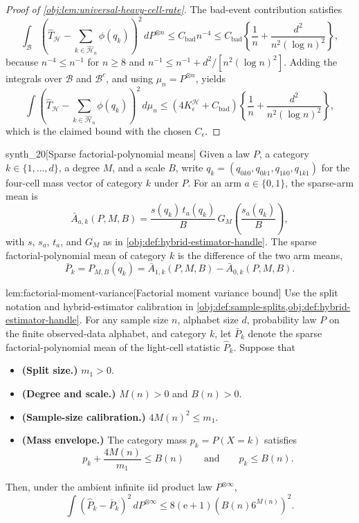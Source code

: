 \documentclass[11pt]{article}
\begin{document}
\begin{proof}[Proof of \cref{obj:lem:universal-heavy-cell-rate}]
The bad-event contribution satisfies
\[
\int_{\mathcal B}
\left(
\widehat T_{\mathcal H}
-
\sum_{k\in\widehat{\mathcal H}_n}\phi(q_k)
\right)^2
\,dP^{\otimes n}
\le
C_{\mathrm{bad}} n^{-4}
\le
C_{\mathrm{bad}}
\left\{
\frac1n+\frac{d^2}{n^2(\log n)^2}
\right\},
\] %
because \(n^{-4}\le n^{-1}\) for \(n\ge8\) and \(n^{-1}\le n^{-1}+d^2/[n^2(\log n)^2]\). Adding the
integrals over \(\mathcal B\) and \(\mathcal B^c\), and using \(\mu_n=P^{\otimes n}\), yields
\[
\int
\left(
\widehat T_{\mathcal H}
-
\sum_{k\in\widehat{\mathcal H}_n}\phi(q_k)
\right)^2
\,d\mu_n
\le
(4K^{\mathcal H}_\epsilon+C_{\mathrm{bad}})
\left\{
\frac1n+\frac{d^2}{n^2(\log n)^2}
\right\},
\]
which is the claimed bound with the chosen \(C_\epsilon\). %
\end{proof}

\begin{definitionv}{synth_20}[Sparse factorial-polynomial means]
Given a law \(P\), a category \(k\in\{1,\ldots,d\}\), a degree \(M\), and a scale \(B\), write \(q_k=(q_{0k0},q_{0k1},q_{1k0},q_{1k1})\) for the four-cell mass vector of category \(k\) under \(P\). For an arm \(a\in\{0,1\}\), the sparse-arm mean is \[ \bar A_{a,k}(P,M,B) = \frac{s(q_k)\,t_a(q_k)}{B}\,G_M\!\left(\frac{s_a(q_k)}{B}\right), \] with \(s\), \(s_a\), \(t_a\), and \(G_M\) as in \cref{obj:def:hybrid-estimator-handle}. The sparse factorial-polynomial mean of category \(k\) is the difference of the two arm means, \[ \bar P_k = P_{M,B}(q_k) = \bar A_{1,k}(P,M,B) - \bar A_{0,k}(P,M,B). \]
\end{definitionv}

\begin{lemmav}{lem:factorial-moment-variance}[Factorial moment variance bound]
Use the split notation and hybrid-estimator calibration in \cref{obj:def:sample-splits,obj:def:hybrid-estimator-handle}.  For any sample size \(n\), alphabet size \(d\), probability law \(P\) on the finite observed-data alphabet, and category \(k\), let \(\bar P_k\) denote the sparse factorial-polynomial mean of the light-cell statistic \(\widehat P_k\).  Suppose that
\begin{itemize}
\item \textbf{(Split size.)} \(m_1>0\).
\item \textbf{(Degree and scale.)} \(M(n)>0\) and \(B(n)>0\).
\item \textbf{(Sample-size calibration.)} \(4M(n)^2\le m_1\).
\item \textbf{(Mass envelope.)} The category mass \(p_k=P(X=k)\) satisfies
\[
p_k+\frac{4M(n)}{m_1}\le B(n)
\qquad\text{and}\qquad
p_k\le B(n).
\]
\end{itemize}
Then, under the ambient infinite iid product law \(P^{\otimes\infty}\),
\[
\int
\left(\widehat P_k-\bar P_k\right)^2
\,dP^{\otimes\infty}
\le
8(\mathrm e+1)\left(B(n)6^{M(n)}\right)^2 .
\]
\end{lemmav}
\end{document}

